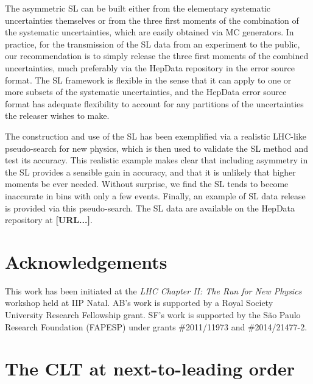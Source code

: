 \documentclass[11pt]{article}
\begin{document}
The asymmetric SL can be built either from the elementary systematic uncertainties themselves or from the three first moments  of the combination of the systematic uncertainties, which are easily obtained via MC generators. 
In practice, for the transmission of the SL data from an experiment to the public, our recommendation is to simply release the three first moments of the combined uncertainties, much preferably via the HepData repository in the error source format.  The SL framework is flexible in the sense that it can apply to one or more subsets of the systematic uncertainties,  and the HepData error source format  has adequate flexibility to account for any partitions of the uncertainties
the releaser wishes to make.



The construction and use of the SL has been exemplified via  a realistic LHC-like pseudo-search for new physics, which is then used to validate the SL method and test its accuracy. 
This realistic example makes clear that including asymmetry in the SL provides a sensible gain in accuracy, and  that it is unlikely that  higher moments be ever needed. Without surprise, we find the SL tends to become inaccurate in bins with only a few events. Finally, an example of SL data release is provided via this pseudo-search.  The SL data are available on the HepData repository at \textbf{[URL...]}.  










\section*{Acknowledgements}

 This work has been initiated at the \textit{LHC Chapter II: The Run for New Physics} workshop held at IIP Natal.
 AB's work is supported by a Royal Society University Research Fellowship grant.
 SF's work is supported by the S\~ao Paulo Research Foundation (FAPESP) under grants \#2011/11973 and \#2014/21477-2.


\appendix

\section{The CLT at next-to-leading order}
\label{app:skew}
\end{document}

